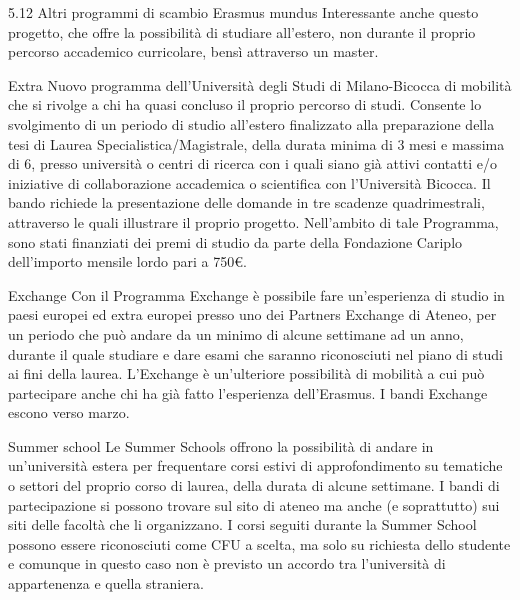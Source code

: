 5.12 Altri programmi di scambio
Erasmus mundus
Interessante anche questo progetto, che offre la possibilità di studiare all'estero, non durante il proprio percorso accademico curricolare, bensì attraverso un master. 

Extra
Nuovo programma dell'Università degli Studi di Milano-Bicocca di mobilità che si rivolge a chi ha quasi concluso il proprio percorso di studi. Consente lo svolgimento di un periodo di studio all'estero finalizzato alla preparazione della tesi di Laurea Specialistica/Magistrale, della durata minima di 3 mesi e massima di 6, presso università o centri di ricerca con i quali siano già attivi contatti e/o iniziative di collaborazione accademica o scientifica con l'Università Bicocca. 
Il bando richiede la presentazione delle domande in tre scadenze quadrimestrali, attraverso le quali illustrare il proprio progetto. Nell'ambito di tale Programma, sono stati finanziati dei premi di studio da parte della Fondazione Cariplo dell'importo mensile lordo pari a 750€. 

Exchange
Con il Programma Exchange è possibile fare un'esperienza di studio in paesi europei ed extra europei presso uno dei Partners Exchange di Ateneo, per un periodo che può andare da un minimo di alcune settimane ad un anno, durante il quale studiare e dare esami che saranno riconosciuti nel piano di studi ai fini della laurea. L'Exchange è un'ulteriore possibilità di mobilità a cui può partecipare anche chi ha già fatto l'esperienza dell'Erasmus. I bandi Exchange escono verso marzo. 

Summer school
Le Summer Schools offrono la possibilità di andare in un'università estera per frequentare corsi estivi di approfondimento su tematiche o settori del proprio corso di laurea, della durata di alcune settimane. I bandi di partecipazione si possono trovare sul sito di ateneo ma anche (e soprattutto) sui siti delle facoltà che li organizzano. I corsi seguiti durante la Summer School possono essere riconosciuti come CFU a scelta, ma solo su richiesta dello studente e comunque in questo caso non è previsto un accordo tra l'università di appartenenza e quella straniera. 
